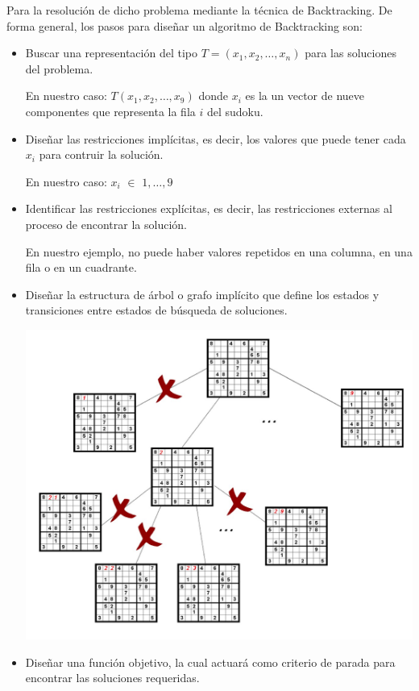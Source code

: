 \documentclass[11pt, a4paper]{article}
\theoremstyle{theorem-style}
\theoremstyle{definition-style}
\theoremstyle{remark-style}
\theoremstyle{example-style}
\begin{document}
Para la resolución de dicho problema mediante la técnica de Backtracking. De forma general, los pasos para diseñar un algoritmo de Backtracking son:
\begin{itemize}
\item Buscar una representación del tipo $T=(x_1, x_2, \ldots, x_n)$ para las soluciones del problema.

En nuestro caso: $T(x_1, x_2, \dots, x_9)$ donde $x_i$ es la un vector de nueve componentes que representa la fila $i$ del sudoku.

\item Diseñar las restricciones implícitas, es decir, los valores que puede tener cada $x_i$ para contruir la solución.

En nuestro caso: $x_i$ $\in$ ${1, \dots, 9}$

\item Identificar las restricciones explícitas, es decir, las restricciones externas al proceso de encontrar la solución.

En nuestro ejemplo, no puede haber valores repetidos en una columna, en una fila o en un cuadrante.


\item Diseñar la estructura de árbol o grafo implícito que define los estados y transiciones entre estados de búsqueda de soluciones.

\includegraphics[scale=0.3]{Grafo_BackTracking}

\item Diseñar una función objetivo, la cual actuará como criterio de parada para encontrar las soluciones requeridas.


\end{itemize}
\end{document}
